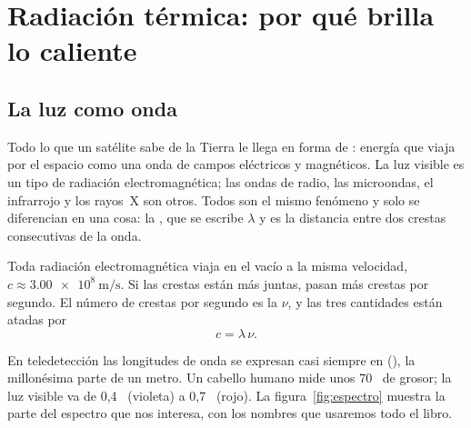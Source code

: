 \chapter{Radiación térmica: por qué brilla lo caliente}\label{cap:radiacion}


\section{La luz como onda}

Todo lo que un satélite sabe de la Tierra le llega en forma de : energía que viaja por el espacio como una onda de campos eléctricos y
magnéticos. La luz visible es un tipo de radiación electromagnética; las ondas de radio, las
microondas, el infrarrojo y los rayos~X son otros. Todos son el mismo fenómeno y solo se
diferencian en una cosa: la , que se escribe $\lambda$ y es la
distancia entre dos crestas consecutivas de la onda.

Toda radiación electromagnética viaja en el vacío a la misma velocidad,
$c \approx \SI{3.00e8}{\metre\per\second}$. Si las crestas están más juntas, pasan más crestas
por segundo. El número de crestas por segundo es la  $\nu$, y las tres
cantidades están atadas por
\begin{equation}
  c = \lambda\,\nu .
\end{equation}

En teledetección las longitudes de onda se expresan casi siempre en 
(\um), la millonésima parte de un metro. Un cabello humano mide unos 70~\um{} de grosor; la luz
visible va de 0,4~\um{} (violeta) a 0,7~\um{} (rojo). La figura~\ref{fig:espectro} muestra la
parte del espectro que nos interesa, con los nombres que usaremos todo el libro.

